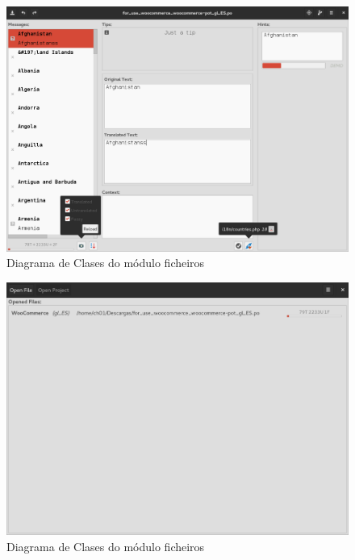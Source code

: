 \begin{figure}[h!]
    \centering
    \includegraphics[width=\textwidth]{img/panel_edicion.png}
    \caption{Diagrama de Clases do módulo ficheiros}
    \label{fig:dia_class:files}
\end{figure}

\begin{figure}[h!]
    \centering
    \includegraphics[width=\textwidth]{img/panel_ficheiros_abertos.png}
    \caption{Diagrama de Clases do módulo ficheiros}
    \label{fig:dia_class:files}
\end{figure}

